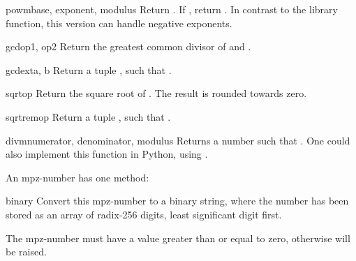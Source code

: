 \begin{funcdesc}{powm}{base, exponent, modulus}
  Return . If
  , return . In contrast to the
  \C{} library function, this version can handle negative exponents.
\end{funcdesc}

\begin{funcdesc}{gcd}{op1, op2}
  Return the greatest common divisor of  and .
\end{funcdesc}

\begin{funcdesc}{gcdext}{a, b}
  Return a tuple , such that
  .
\end{funcdesc}

\begin{funcdesc}{sqrt}{op}
  Return the square root of . The result is rounded towards zero.
\end{funcdesc}

\begin{funcdesc}{sqrtrem}{op}
  Return a tuple , such that
  .
\end{funcdesc}

\begin{funcdesc}{divm}{numerator, denominator, modulus}
  Returns a number  such that
  .  One could also implement this function in Python,
  using .
\end{funcdesc}

An mpz-number has one method:

\begin{methoddesc}[mpz]{binary}{}
  Convert this mpz-number to a binary string, where the number has been
  stored as an array of radix-256 digits, least significant digit first.

  The mpz-number must have a value greater than or equal to zero,
  otherwise  will be raised.
\end{methoddesc}
